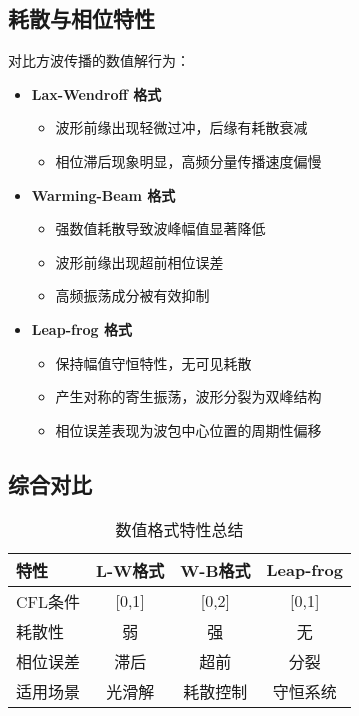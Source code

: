 \documentclass[UTF8]{ctexart}
\begin{document}
\subsection{耗散与相位特性}
对比方波传播的数值解行为：

\begin{itemize}
    \item \textbf{Lax-Wendroff 格式}
    \begin{itemize}
        \item 波形前缘出现轻微过冲，后缘有耗散衰减
        \item 相位滞后现象明显，高频分量传播速度偏慢
    \end{itemize}
    
    \item \textbf{Warming-Beam 格式}
    \begin{itemize}
        \item 强数值耗散导致波峰幅值显著降低
        \item 波形前缘出现超前相位误差
        \item 高频振荡成分被有效抑制
    \end{itemize}
    
    \item \textbf{Leap-frog 格式}
    \begin{itemize}
        \item 保持幅值守恒特性，无可见耗散
        \item 产生对称的寄生振荡，波形分裂为双峰结构
        \item 相位误差表现为波包中心位置的周期性偏移
    \end{itemize}
\end{itemize}

\subsection{综合对比}
\begin{table}[h]
    \centering
    \caption{数值格式特性总结}
    \begin{tabular}{l|ccc}
    特性         & L-W格式 & W-B格式 & Leap-frog \\ \hline
    CFL条件      & [0,1]   & [0,2]   & [0,1]     \\
    耗散性       & 弱      & 强      & 无        \\
    相位误差     & 滞后    & 超前    & 分裂      \\
    适用场景     & 光滑解  & 耗散控制 & 守恒系统  \\
    \end{tabular}
\end{table}
\end{document}
